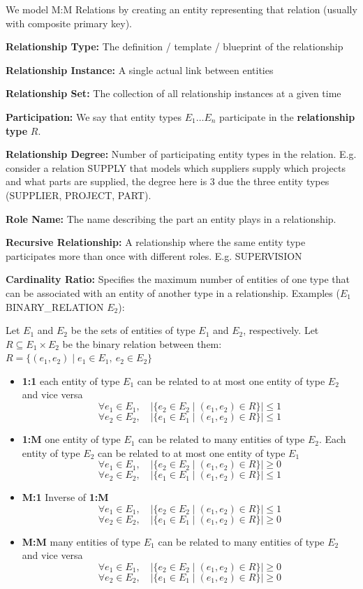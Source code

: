 \documentclass{article}
\begin{document}
We model M:M Relations by creating an entity representing that relation (usually with composite primary key).

\textbf{Relationship Type: }The definition / template / blueprint of the relationship

\textbf{Relationship Instance: }A single actual link between entities

\textbf{Relationship Set: } The collection of all relationship instances at a given time

\textbf{Participation: }We say that entity types $E_1 \dots E_n$ participate in the \textbf{relationship type} $R$.

\textbf{Relationship Degree: }Number of participating entity types in the relation. E.g. consider a relation SUPPLY that models which suppliers supply which projects and what parts are supplied, the degree here is 3 due the three entity types (SUPPLIER, PROJECT, PART).

\textbf{Role Name: }The name describing the part an entity plays in a relationship.

\textbf{Recursive Relationship: }A relationship where the same entity type participates more than once with different roles. E.g. SUPERVISION

\textbf{Cardinality Ratio: }Specifies the maximum number of entities of one type that can be associated with an entity of another type in a relationship. Examples ($E_1$ BINARY\_RELATION $E_2$):

Let $E_1$ and $E_2$ be the sets of entities of type $E_1$ and $E_2$, respectively. Let $R \subseteq E_1 \times E_2$ be the binary relation between them: $R = \{ (e_1, e_2) \mid e_1 \in E_1,\ e_2 \in E_2 \}$
\begin{itemize}
    \item \textbf{1:1 }each entity of type $E_1$ can be related to at most one entity of type $E_2$ and vice versa
    \[
    \forall e_1 \in E_1, \quad |\{ e_2 \in E_2 \mid (e_1, e_2) \in R \}| \leq 1
    \]
    \[
    \forall e_2 \in E_2, \quad |\{ e_1 \in E_1 \mid (e_1, e_2) \in R \}| \leq 1
    \]
    \item \textbf{1:M }one entity of type $E_1$ can be related to many entities of type $E_2$. Each entity of type $E_2$ can be related to at most one entity of type $E_1$
    \[
        \forall e_1 \in E_1, \quad |\{ e_2 \in E_2 \mid (e_1, e_2) \in R \}| \geq 0
        \]
        \[
        \forall e_2 \in E_2, \quad |\{ e_1 \in E_1 \mid (e_1, e_2) \in R \}| \leq 1
    \]
    \item \textbf{M:1 }Inverse of \textbf{1:M }
    \[
        \forall e_1 \in E_1, \quad |\{ e_2 \in E_2 \mid (e_1, e_2) \in R \}| \leq 1
        \]
        \[
        \forall e_2 \in E_2, \quad |\{ e_1 \in E_1 \mid (e_1, e_2) \in R \}| \geq 0
    \]
    \item \textbf{M:M }many entities of type $E_1$ can be related to many entities of type $E_2$ and vice versa
    \[
        \forall e_1 \in E_1, \quad |\{ e_2 \in E_2 \mid (e_1, e_2) \in R \}| \geq 0
        \]
        \[
        \forall e_2 \in E_2, \quad |\{ e_1 \in E_1 \mid (e_1, e_2) \in R \}| \geq 0
    \]
\end{itemize}
\end{document}
